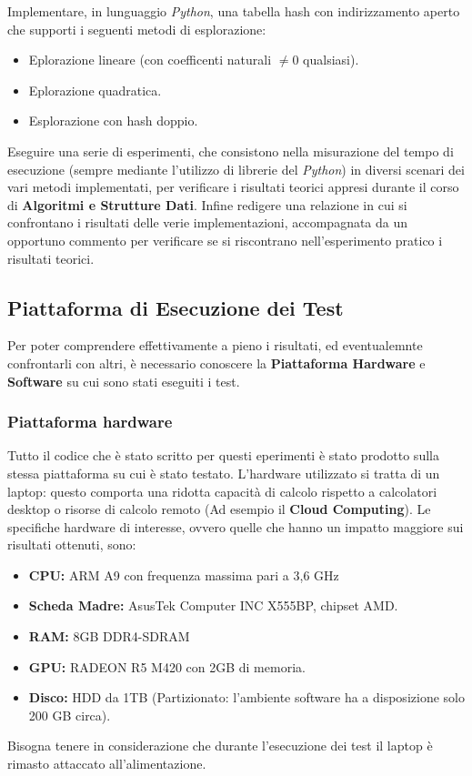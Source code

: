 \documentclass{article}
\begin{document}
Implementare, in lunguaggio \emph{Python}, una tabella hash con indirizzamento aperto che supporti i seguenti metodi di esplorazione:
\begin{itemize}
\item Eplorazione lineare (con coefficenti naturali $\neq 0$ qualsiasi).
\item Eplorazione quadratica.
\item Esplorazione con hash doppio.
\end{itemize}
Eseguire una serie di esperimenti, che consistono nella misurazione del tempo di esecuzione (sempre mediante l'utilizzo di librerie del \emph{Python}) in diversi scenari dei vari metodi implementati, per verificare i risultati teorici appresi durante il corso di \textbf{Algoritmi e Strutture Dati}.
Infine redigere una relazione in cui si confrontano i risultati delle verie implementazioni, accompagnata da un opportuno commento per verificare se si riscontrano nell'esperimento pratico i risultati teorici.

\subsection{Piattaforma di Esecuzione dei Test}

Per poter comprendere effettivamente a pieno i risultati, ed eventualemnte confrontarli con altri, è necessario conoscere la \textbf{Piattaforma Hardware} e \textbf{Software} su cui sono stati eseguiti i test.
\subsubsection{Piattaforma hardware}

Tutto il codice che è stato scritto per questi eperimenti è stato prodotto sulla stessa piattaforma su cui è stato testato. L'hardware utilizzato si tratta di un laptop: questo comporta una ridotta capacità di calcolo rispetto a calcolatori desktop o risorse di calcolo remoto (Ad esempio il \textbf{Cloud Computing}).
Le specifiche hardware di interesse, ovvero quelle che hanno un impatto maggiore sui risultati ottenuti, sono:
\begin{itemize}
\item \textbf{CPU:} ARM A9 con frequenza massima pari a 3,6 GHz
\item \textbf{Scheda Madre:} AsusTek Computer INC X555BP, chipset AMD.
\item \textbf{RAM:} 8GB DDR4-SDRAM
\item \textbf{GPU:} RADEON R5 M420 con 2GB di memoria.
\item \textbf{Disco:} HDD da 1TB (Partizionato: l'ambiente software ha a disposizione solo 200 GB circa).
\end{itemize} 
Bisogna tenere in considerazione che durante l'esecuzione dei test il laptop è rimasto attaccato all'alimentazione.
\end{document}
